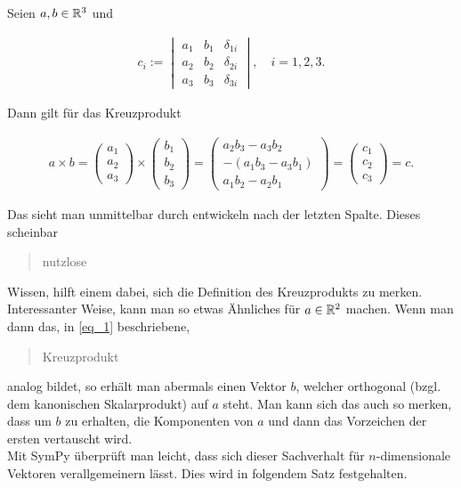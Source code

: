 \begin{remark*}

Seien $a, b \in \mathbb{R}^3$ und

\begin{align} \label{eq_1}
  c_i
  :=
  \begin{vmatrix}
    a_1 & b_1 & \delta_{1 i} \\
    a_2 & b_2 & \delta_{2 i} \\
    a_3 & b_3 & \delta_{3 i}
  \end{vmatrix},
  \quad
  i = 1, 2, 3.
\end{align}

Dann gilt für das Kreuzprodukt

\begin{align*}
  a \times b
  =
  \begin{pmatrix}
    a_1 \\
    a_2 \\
    a_3
  \end{pmatrix}
  \times
  \begin{pmatrix}
  b_1 \\
  b_2 \\
  b_3
  \end{pmatrix}
  =
  \begin{pmatrix}
      a_2 b_3 - a_3 b_2 \\
    -(a_1 b_3 - a_3 b_1) \\
      a_1 b_2 - a_2 b_1
  \end{pmatrix}
  =
  \begin{pmatrix}
    c_1 \\
    c_2 \\
    c_3
  \end{pmatrix}
  = c.
\end{align*}

Das sieht man unmittelbar durch entwickeln nach der letzten Spalte.
Dieses scheinbar \blockquote{nutzlose} Wissen, hilft einem dabei, sich die Definition des Kreuzprodukts zu merken. \\

Interessanter Weise, kann man so etwas Ähnliches für $a \in \mathbb{R}^2$ machen.
Wenn man dann das, in \eqref{eq_1} beschriebene, \blockquote{Kreuzprodukt} analog bildet, so erhält man abermals einen Vektor $b$, welcher orthogonal (bzgl. dem kanonischen Skalarprodukt) auf $a$ steht.
Man kann sich das auch so merken, dass um $b$ zu erhalten, die Komponenten von $a$ und dann das Vorzeichen der ersten vertauscht wird. \\

Mit SymPy überprüft man leicht, dass sich dieser Sachverhalt für $n$-dimensionale Vektoren verallgemeinern lässt.
Dies wird in folgendem Satz festgehalten.

\end{remark*}
